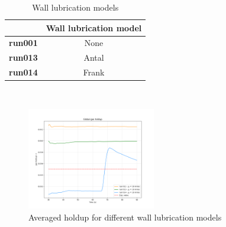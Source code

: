 \documentclass[11pt,a4paper]{article}
\begin{document}
\begin{table}[H]
    \centering 
    \begin{tabular}{|p{8em} c |}
    \hline
    \rowcolor{bluePoli!40}
    & \textbf{Wall lubrication model} \T\B \\
    \hline \hline
    \textbf{run001} & None \T\B \\
    \textbf{run013} & Antal \T\B \\
    \textbf{run014} & Frank \T\B \\
    \hline
    \end{tabular}
    \\[10pt]
    \caption{Wall lubrication models}
    \label{table:wall_lubrication_models}
\end{table}

\begin{figure}[H]
    \centering
    \includegraphics[width=0.5\textwidth]{Images/graphs/walllub/holdUp10.png}
    \caption{Averaged holdup for different wall lubrication models}
    \label{fig:holdup_walllub}
\end{figure}
\end{document}
